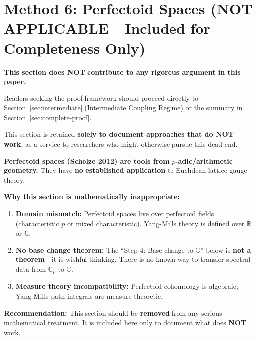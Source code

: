 \section{Method 6: Perfectoid Spaces (NOT APPLICABLE---Included for Completeness Only)}
\label{sec:perfectoid}

\begin{tcolorbox}[colback=red!30,colframe=red!90!black,title=\textbf{$\bigstar$ READER GUIDANCE: SKIP THIS SECTION $\bigstar$}]
\textbf{This section does NOT contribute to any rigorous argument in this paper.}

Readers seeking the proof framework should proceed directly to 
Section~\ref{sec:intermediate} (Intermediate Coupling Regime) or the 
summary in Section~\ref{sec:complete-proof}.

This section is retained \textbf{solely to document approaches that do NOT work}, 
as a service to researchers who might otherwise pursue this dead end.
\end{tcolorbox}

\begin{tcolorbox}[colback=red!30,colframe=red!90!black,title=\textbf{CRITICAL WARNING: CATEGORY ERROR---This Section Should Be Disregarded}]
\textbf{Perfectoid spaces (Scholze 2012) are tools from $p$-adic/arithmetic geometry.}
They have \textbf{no established application} to Euclidean lattice gauge theory.

\textbf{Why this section is mathematically inappropriate:}
\begin{enumerate}
\item \textbf{Domain mismatch:} Perfectoid spaces live over perfectoid fields (characteristic $p$ 
or mixed characteristic). Yang-Mills theory is defined over $\mathbb{R}$ or $\mathbb{C}$.
\item \textbf{No base change theorem:} The ``Step 4: Base change to $\mathbb{C}$'' below is 
\textbf{not a theorem}---it is wishful thinking. There is no known way to transfer 
spectral data from $\mathbb{C}_p$ to $\mathbb{C}$.
\item \textbf{Measure theory incompatibility:} Perfectoid cohomology is algebraic; 
Yang-Mills path integrals are measure-theoretic.
\end{enumerate}

\textbf{Recommendation:} This section should be \textbf{removed} from any serious 
mathematical treatment. It is included here only to document what does \textbf{NOT} work.
\end{tcolorbox}

